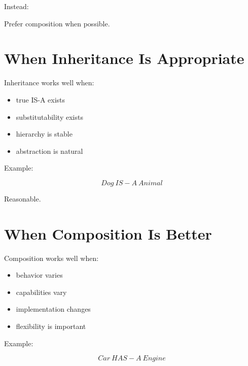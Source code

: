 \documentclass[11pt,a4paper]{book}
\begin{document}

Instead:

\begin{center}
Prefer composition when possible.
\end{center}


\section{When Inheritance Is Appropriate}

Inheritance works well when:

\begin{itemize}
\item true IS-A exists
\item substitutability exists
\item hierarchy is stable
\item abstraction is natural
\end{itemize}


Example:

\[
Dog\ IS\!-\!A\ Animal
\]


Reasonable.


\section{When Composition Is Better}

Composition works well when:

\begin{itemize}
\item behavior varies
\item capabilities vary
\item implementation changes
\item flexibility is important
\end{itemize}


Example:

\[
Car\ HAS\!-\!A\ Engine
\]

\end{document}
